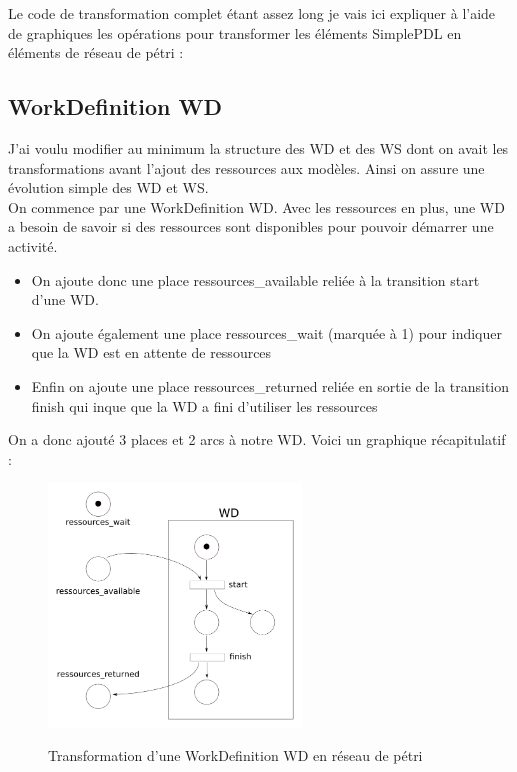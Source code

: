 Le code de transformation complet étant assez long je vais ici expliquer à l'aide de graphiques les opérations pour transformer les éléments SimplePDL en éléments de réseau de pétri :\\

\subsection{WorkDefinition WD}
J'ai voulu modifier au minimum la structure des WD et des WS dont on avait les transformations avant l'ajout des ressources aux modèles.
Ainsi on assure une évolution simple des WD et WS.\\

On commence par une WorkDefinition WD. Avec les ressources en plus, une WD a besoin de savoir si des ressources sont disponibles pour pouvoir démarrer une activité.
\begin{itemize}
   \item On ajoute donc une place ressources\_available reliée à la transition start d'une WD.
   \item On ajoute également une place ressources\_wait (marquée à 1) pour indiquer que la WD est en attente de ressources
   \item Enfin on ajoute une place ressources\_returned reliée en sortie de la transition finish qui inque que la WD a fini d'utiliser les ressources
\end{itemize}

\vspace{1em}
On a donc ajouté 3 places et 2 arcs à notre WD. Voici un graphique récapitulatif :

\begin{figure}[h]
\centering
\includegraphics[width=0.6\textwidth]{../Images/WD2petri.png}
\label{WD2petri}
\caption{Transformation d'une WorkDefinition WD en réseau de pétri}
\end{figure}

